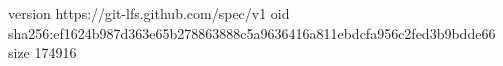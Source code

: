 version https://git-lfs.github.com/spec/v1
oid sha256:ef1624b987d363e65b278863888c5a9636416a811ebdcfa956c2fed3b9bdde66
size 174916
